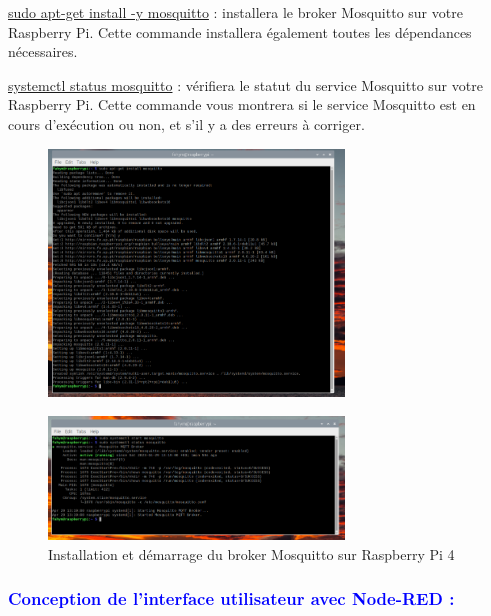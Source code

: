 \begin{flushleft}
				  \underline{sudo apt-get install -y mosquitto} : installera le broker Mosquitto sur votre Raspberry Pi. Cette commande installera également toutes les dépendances nécessaires.
				  
				  \underline{systemctl status mosquitto} : vérifiera le statut du service Mosquitto sur votre Raspberry Pi. Cette commande vous montrera si le service Mosquitto est en cours d'exécution ou non, et s'il y a des erreurs à corriger.
			\begin{figure}[h]
				\centering
				\includegraphics[width=0.7\textwidth]{chapitres/images/mosquitto1.PNG}
			\end{figure}
	 		\begin{figure}[h]
	 		\centering
	 		\includegraphics[width=0.7\textwidth]{chapitres/images/mosquitto2.PNG}
	 		\caption{Installation et démarrage du broker Mosquitto sur Raspberry Pi 4}
	 		\label{fig:labelname}
	 		\end{figure}
 		\newpage
	\subsubsection{\textcolor{blue}{Conception de l'interface utilisateur avec Node-RED :} }
		

\end{flushleft}
